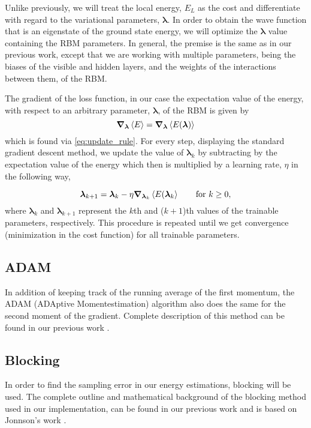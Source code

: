 Unlike previously, we will treat the local energy, $E_L$ as the cost and differentiate with regard to the variational parameters, $\bm{\lambda}$. In order to obtain the wave function that is an eigenstate of the ground state energy, we will optimize the $\bm{\lambda}$ value containing the RBM parameters. In general, the premise is the same as in our previous work, except that we are working with multiple parameters, being the biases of the visible and hidden layers, and the weights of the interactions between them, of the RBM. 

The gradient of the loss function, in our case the expectation value of the energy, with respect to an arbitrary parameter, $\bm{\lambda}$, of the RBM is given by
\begin{equation*}
    \grad_{\bm{\lambda}}\expval{E} = \grad_{\bm{\lambda}}\expval{E\qty(\bm{\lambda})}
\end{equation*}
which is found via \autoref{eq:update_rule}. 
For every step, displaying the standard gradient descent method, we update the value of $\bm{\lambda}_k$ by subtracting by the expectation value of the energy which then is multiplied by a learning rate, $\eta $ in the following way,

\begin{equation*}
    \bm{\lambda}_{k+1} =  \bm{\lambda}_k - \eta \grad_{\bm{\lambda}_k}\expval{E(\bm{\lambda}_k} \qquad \text{for} \,\, k \geq 0, 
\end{equation*}
where $\bm{\lambda}_k$ and $\bm{\lambda}_{k+1}$ represent the $k$th and ($k+1$)th values of the trainable parameters, respectively. This procedure is repeated until we get convergence (minimization in the cost function) for all trainable parameters.
\subsection{ADAM}
In addition of keeping track of the running average of the first momentum, the ADAM (ADAptive Momentestimation) algorithm also does the same for the second moment of the gradient. Complete description of this method can be found in our previous work \citep{project1}. 

\subsection{Blocking}
In order to find the sampling error in our energy estimations, blocking will be used. The complete outline and mathematical background of the blocking method used in our implementation, can be found in our previous work \citep{project1} and is based on Jonnson’s work \citep{MariusJonsson}. %


